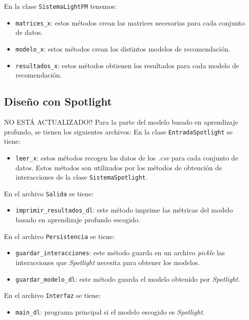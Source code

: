En la clase \texttt{SistemaLightFM} tenemos:
\begin{itemize}
\tightlist
\item \texttt{matrices\_x}: estos métodos crean las matrices necesarias para cada conjunto de datos. 
\item \texttt{modelo\_x}: estos métodos crean los distintos modelos de recomendación. 
\item \texttt{resultados\_x}: estos métodos obtienen los resultados para cada modelo de recomendación. 
\end{itemize}

\subsection{Diseño con Spotlight}\label{diseño-spotlight}
NO ESTÁ ACTUALIZADO!!
Para la parte del modelo basado en aprendizaje profundo, se tienen los siguientes archivos:
En la clase \texttt{EntradaSpotlight} se tiene:
\begin{itemize}
\tightlist
\item \texttt{leer\_x}: estos métodos recogen los datos de los \textit{.csv} para cada conjunto de datos. Estos métodos son utilizados por los métodos de obtención de interacciones de la clase \texttt{SistemaSpotlight}.
\end{itemize}

En el archivo \texttt{Salida} se tiene:
\begin{itemize}
\tightlist
\item \texttt{imprimir\_resultados\_dl}: este método imprime las métricas del modelo basado en aprendizaje profundo escogido.
\end{itemize}

En el archivo \texttt{Persistencia} se tiene:
\begin{itemize}
\tightlist
\item \texttt{guardar\_interacciones}: este método guarda en un archivo \textit{pickle} las interacciones que \textit{Spotlight} necesita para obtener los modelos.
\item \texttt{guardar\_modelo\_dl}: este método guarda el modelo obtenido por \textit{Spotlight}.
\end{itemize}

En el archivo \texttt{Interfaz} se tiene:
\begin{itemize}
\tightlist 
\item \texttt{main\_dl}: programa principal si el modelo escogido es \textit{Spotlight}. 
\end{itemize}

